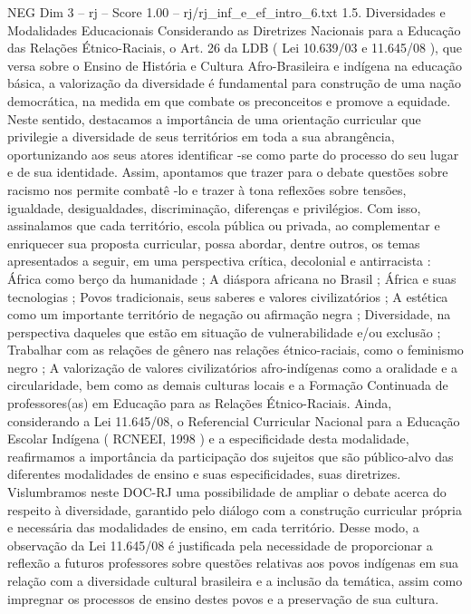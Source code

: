 \begin{textsample}{NEG Dim 3 – rj – Score 1.00 – rj/rj\_inf\_e\_ef\_intro\_6.txt}  \label{ex:f3_neg_271}
1.5.
Diversidades e Modalidades Educacionais Considerando as Diretrizes Nacionais para a Educação das Relações Étnico-Raciais, o Art. 26 da LDB ( Lei 10.639/03 e 11.645/08 ), que versa sobre o Ensino de História e Cultura Afro-Brasileira e indígena na educação básica, a valorização da diversidade é fundamental para construção de uma nação democrática, na medida em que combate os preconceitos e promove a equidade.
Neste sentido, destacamos a importância de uma orientação curricular que privilegie a diversidade de seus territórios em toda a sua abrangência, oportunizando aos seus atores identificar -se como parte do processo do seu lugar e de sua identidade.
Assim, apontamos que trazer para o debate questões sobre racismo nos permite combatê -lo e trazer à tona reflexões sobre tensões, igualdade, desigualdades, discriminação, diferenças e privilégios.
Com isso, assinalamos que cada território, escola pública ou privada, ao complementar e enriquecer sua proposta curricular, possa abordar, dentre outros, os temas apresentados a seguir, em uma perspectiva crítica, decolonial e antirracista : África como berço da humanidade ; A diáspora africana no Brasil ; África e suas tecnologias ; Povos tradicionais, seus saberes e valores civilizatórios ; A estética como um importante território de negação ou afirmação negra ; Diversidade, na perspectiva daqueles que estão em situação de vulnerabilidade e/ou exclusão ; Trabalhar com as relações de gênero nas relações étnico-raciais, como o feminismo negro ; A valorização de valores civilizatórios afro-indígenas como a oralidade e a circularidade, bem como as demais culturas locais e a Formação Continuada de professores(as) em Educação para as Relações Étnico-Raciais.
Ainda, considerando a Lei 11.645/08, o Referencial Curricular Nacional para a Educação Escolar Indígena ( RCNEEI, 1998 ) e a especificidade desta modalidade, reafirmamos a importância da participação dos sujeitos que são público-alvo das diferentes modalidades de ensino e suas especificidades, suas diretrizes.
Vislumbramos neste DOC-RJ uma possibilidade de ampliar o debate acerca do respeito à diversidade, garantido pelo diálogo com a construção curricular própria e necessária das modalidades de ensino, em cada território.
Desse modo, a observação da Lei 11.645/08 é justificada pela necessidade de proporcionar a reflexão a futuros professores sobre questões relativas aos povos indígenas em sua relação com a diversidade cultural brasileira e a inclusão da temática, assim como impregnar os processos de ensino destes povos e a preservação de sua cultura.

\end{textsample}
